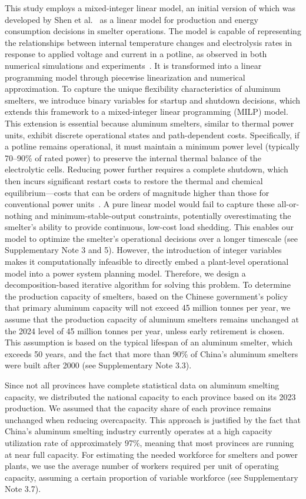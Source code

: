 \documentclass[preprint]{elsarticle}
\begin{document}
This study employs a mixed-integer linear model, an initial version of which was developed by Shen et al.~\citep{shen_improved_2025} as a linear model for production and energy consumption decisions in smelter operations. The model is capable of representing the relationships between internal temperature changes and electrolysis rates in response to applied voltage and current in a potline, as observed in both numerical simulations and experiments~\citep{oye_power_2011,oye_power_nodate}. It is transformed into a linear programming model through piecewise linearization and numerical approximation. To capture the unique flexibility characteristics of aluminum smelters, we introduce binary variables for startup and shutdown decisions, which extends this framework to a mixed-integer linear programming (MILP) model. This extension is essential because aluminum smelters, similar to thermal power units, exhibit discrete operational states and path-dependent costs. Specifically, if a potline remains operational, it must maintain a minimum power level (typically 70--90\% of rated power) to preserve the internal thermal balance of the electrolytic cells. Reducing power further requires a complete shutdown, which then incurs significant restart costs to restore the thermal and chemical equilibrium—costs that can be orders of magnitude higher than those for conventional power units~\citep{smith_analysis_2019}. A pure linear model would fail to capture these all-or-nothing and minimum-stable-output constraints, potentially overestimating the smelter's ability to provide continuous, low-cost load shedding. This enables our model to optimize the smelter's operational decisions over a longer timescale (see Supplementary Note 3 and 5). However, the introduction of integer variables makes it computationally infeasible to directly embed a plant-level operational model into a power system planning model. Therefore, we design a decomposition-based iterative algorithm for solving this problem. To determine the production capacity of smelters, based on the Chinese government's policy that primary aluminum capacity will not exceed 45 million tonnes per year, we assume that the production capacity of aluminum smelters remains unchanged at the 2024 level of 45 million tonnes per year, unless early retirement is chosen. This assumption is based on the typical lifespan of an aluminum smelter, which exceeds 50 years, and the fact that more than 90\% of China's aluminum smelters were built after 2000 (see Supplementary Note 3.3). 

Since not all provinces have complete statistical data on aluminum smelting capacity, we distributed the national capacity to each province based on its 2023 production. We assumed that the capacity share of each province remains unchanged when reducing overcapacity. This approach is justified by the fact that China's aluminum smelting industry currently operates at a high capacity utilization rate of approximately 97\%, meaning that most provinces are running at near full capacity. For estimating the needed workforce for smelters and power plants, we use the average number of workers required per unit of operating capacity, assuming a certain proportion of variable workforce (see Supplementary Note 3.7).
\end{document}
